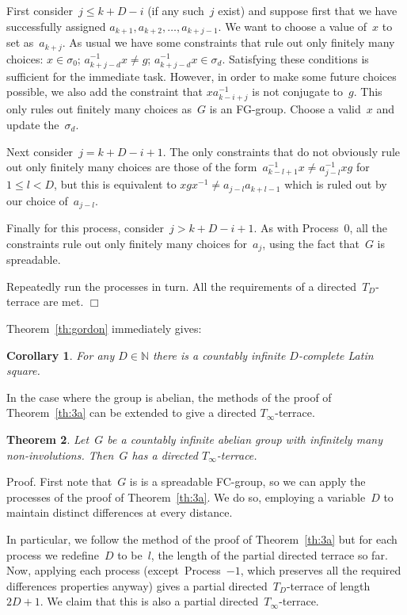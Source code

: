 \documentclass[12pt,a4paper]{article}
\newtheorem{thm}{Theorem}
\newtheorem{cor}[thm]{Corollary}
\newcommand{\N}{\mathbb{N}}
\newcommand{\qed}{\unskip\protect\nolinebreak\mbox{\quad$\Box$}\vspace{3mm}}
\begin{document}
First consider~$j \leq k+D-i$ (if any such~$j$ exist) and suppose first that we have successfully assigned  $a_{k+1}, a_{k+2}, \ldots, a_{k+j-1}$.  We want to choose a value of~$x$ to set as~$a_{k+j}$.  As usual we have some constraints that rule out only finitely many choices: $x \in \sigma_0$; $a_{k+j-d}^{-1} x \neq g$;  $a_{k+j-d}^{-1}x \in \sigma_d$.  Satisfying these conditions is  sufficient for the immediate task.  However, in order to make some future choices possible, we also add the constraint that $xa_{k-i+j}^{-1}$ is not conjugate to~$g$.  This only rules out finitely many choices as~$G$ is an FG-group.  Choose a valid~$x$ and update the~$\sigma_d$.

Next consider~$j = k+D-i+1$.  The only constraints that do not obviously rule out only finitely many choices are those of the form~$a_{k-l+1}^{-1}x \neq a_{j -l}^{-1}xg$ for~$1 \leq l < D$, but this is equivalent to $ x g x^{-1}\neq a_{j-l}a_{k+l-1} $ which is ruled out by our choice of~$a_{j-l}$.

Finally for this process, consider~$j > k+D-i+1$.  As with Process~0, all the constraints rule out only finitely many choices for~$ a_j$, using the fact that~$G$ is spreadable.

Repeatedly run the processes in turn.  All the requirements of a directed~$T_D$-terrace are met.
\qed

Theorem~\ref{th:gordon} immediately gives:

\begin{cor}
For any $D \in \N$ there is a countably infinite $D$-complete Latin square.
\end{cor}


In the case where the group is abelian, the methods of the proof of Theorem~\ref{th:3a} can be extended to give a directed $T_{\infty}$-terrace.

\begin{thm}\label{th:3b}
Let~$G$ be a countably infinite abelian group with infinitely many non-involutions.  Then~$G$ has a directed $T_{\infty}$-terrace.
\end{thm}

\noindent
Proof.
First note that~$G$ is is a spreadable FC-group, so we can apply the processes of the proof of Theorem~\ref{th:3a}.  We do so, employing a variable~$D$ to maintain distinct differences at every distance.

In particular, we follow the method of the proof of Theorem~\ref{th:3a} but for each process we redefine~$D$ to be~$l$, the length of the partial directed terrace so far.  Now, applying each process (except~Process~$-1$, which preserves all the required differences properties anyway) gives a partial directed~$T_D$-terrace of length~$2D+1$.  We claim that this is also a partial directed~$T_{\infty}$-terrace.
\end{document}
